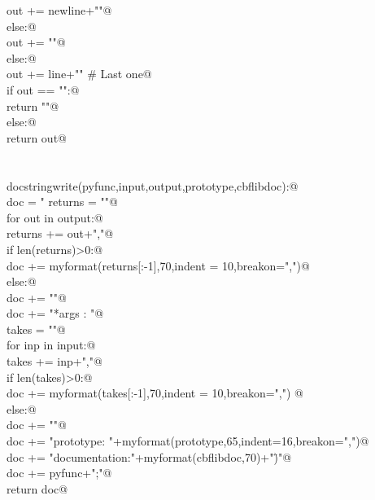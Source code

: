 \documentclass[10pt,a4paper,twoside,notitlepage]{article}
\begin{document}
\begin{flushleft}
\begin{minipage}{\linewidth}
\begin{list}{}{}
\mbox{}\verb@            out += newline+"\n"@\\
\mbox{}\verb@         else:@\\
\mbox{}\verb@            out += "\n"@\\
\mbox{}\verb@      else:@\\
\mbox{}\verb@         out += line+"\n" # Last one@\\
\mbox{}\verb@   if out == "":@\\
\mbox{}\verb@      return "\n"@\\
\mbox{}\verb@   else:@\\
\mbox{}\verb@      return out@\\
\mbox{}\verb@@\\
\mbox{}\verb@@\\
\mbox{}\verb@def docstringwrite(pyfunc,input,output,prototype,cbflibdoc):@\\
\mbox{}\verb@   doc = "%feature(\"autodoc\", \"\nReturns : "@\\
\mbox{}\verb@   returns = ""@\\
\mbox{}\verb@   for out in output:@\\
\mbox{}\verb@      returns += out+","@\\
\mbox{}\verb@   if len(returns)>0:@\\
\mbox{}\verb@      doc += myformat(returns[:-1],70,indent = 10,breakon=",")@\\
\mbox{}\verb@   else:@\\
\mbox{}\verb@      doc += "\n"@\\
\mbox{}\verb@   doc += "*args   : "@\\
\mbox{}\verb@   takes = ""@\\
\mbox{}\verb@   for inp in input:@\\
\mbox{}\verb@      takes += inp+","@\\
\mbox{}\verb@   if len(takes)>0:@\\
\mbox{}\verb@      doc += myformat(takes[:-1],70,indent = 10,breakon=",")   @\\
\mbox{}\verb@   else:@\\
\mbox{}\verb@      doc += "\n"@\\
\mbox{}\verb@   doc += "\nC prototype: "+myformat(prototype,65,indent=16,breakon=",")@\\
\mbox{}\verb@   doc += "\nCBFLib documentation:\n"+myformat(cbflibdoc,70)+"\")"@\\
\mbox{}\verb@   doc += pyfunc+";\n"@\\
\mbox{}\verb@   return doc@\\

\end{list}
\end{minipage}
\end{flushleft}
\end{document}
